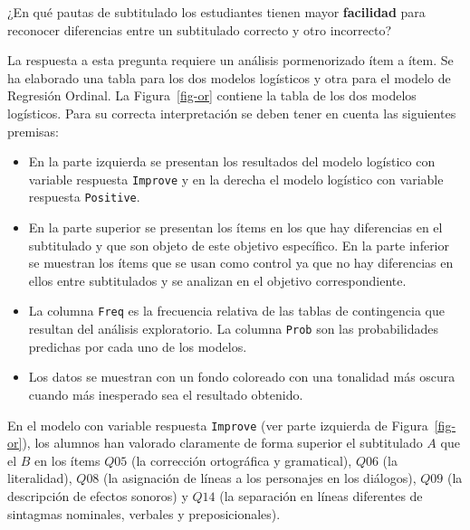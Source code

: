 \documentclass[
  12pt,
  a4paper,
  extrafontsizes,
  onecolumn,
  openright,
  table]{memoir}
\providecommand{\tightlist}{%
  \setlength{\itemsep}{0pt}\setlength{\parskip}{0pt}}\usepackage{longtable,booktabs,array}
\begin{document}
\begin{tcolorbox}[enhanced jigsaw, arc=.35mm, bottomtitle=1mm, left=2mm, toptitle=1mm, breakable, opacitybacktitle=0.6, rightrule=.15mm, toprule=.15mm, colbacktitle=quarto-callout-tip-color!10!white, leftrule=.75mm, colframe=quarto-callout-tip-color-frame, colback=white, titlerule=0mm, opacityback=0, bottomrule=.15mm, coltitle=black, title=\textcolor{quarto-callout-tip-color}{\faLightbulb}\hspace{0.5em}{Objetivo específico}]

¿En qué pautas de subtitulado los estudiantes tienen mayor
\textbf{facilidad} para reconocer diferencias entre un subtitulado
correcto y otro incorrecto?

\end{tcolorbox}

La respuesta a esta pregunta requiere un análisis pormenorizado ítem a
ítem. Se ha elaborado una tabla para los dos modelos logísticos y otra
para el modelo de Regresión Ordinal. La Figura~\ref{fig-or} contiene la
tabla de los dos modelos logísticos. Para su correcta interpretación se
deben tener en cuenta las siguientes premisas:

\begin{itemize}
\tightlist
\item
  En la parte izquierda se presentan los resultados del modelo logístico
  con variable respuesta \texttt{Improve} y en la derecha el modelo
  logístico con variable respuesta \texttt{Positive}.
\item
  En la parte superior se presentan los ítems en los que hay diferencias
  en el subtitulado y que son objeto de este objetivo específico. En la
  parte inferior se muestran los ítems que se usan como control ya que
  no hay diferencias en ellos entre subtitulados y se analizan en el
  objetivo correspondiente.
\item
  La columna \texttt{Freq} es la frecuencia relativa de las tablas de
  contingencia que resultan del análisis exploratorio. La columna
  \texttt{Prob} son las probabilidades predichas por cada uno de los
  modelos.
\item
  Los datos se muestran con un fondo coloreado con una tonalidad más
  oscura cuando más inesperado sea el resultado obtenido.
\end{itemize}

En el modelo con variable respuesta \texttt{Improve} (ver parte
izquierda de Figura~\ref{fig-or}), los alumnos han valorado claramente
de forma superior el subtitulado \(A\) que el \(B\) en los ítems \(Q05\)
(la corrección ortográfica y gramatical), \(Q06\) (la literalidad),
\(Q08\) (la asignación de líneas a los personajes en los diálogos),
\(Q09\) (la descripción de efectos sonoros) y \(Q14\) (la separación en
líneas diferentes de sintagmas nominales, verbales y preposicionales).
\end{document}
